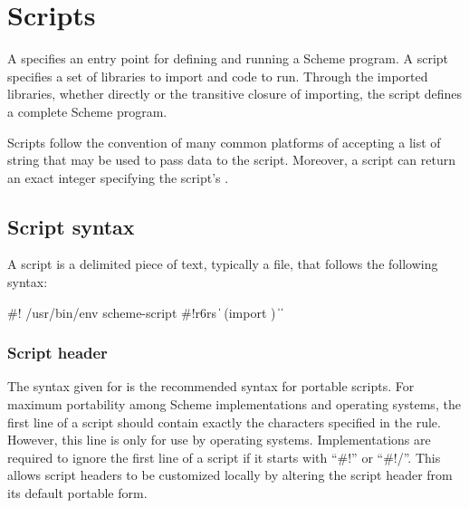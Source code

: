 \chapter{Scripts}
\label{scriptchapter}

A  specifies an entry point for defining and running
a Scheme program.  A script specifies a set of libraries to import and
code to run.  Through the imported libraries, whether directly or the
transitive closure of importing, the script defines a complete Scheme
program.

Scripts follow the convention of many common platforms of accepting a
list of string  that may be used to
pass data to the script.  Moreover, a script can return an exact
integer specifying the script's .

\section{Script syntax}

A script is a delimited piece of text, typically a file, that follows
the following syntax:

\begin{grammar}
 \: \#! /usr/bin/env scheme-script
  \> 
  \> 
 \: \#!r6rs  
  \> \|  
 \: (import )
 \:  
 \: 
\> \| 
\> \| 
\end{grammar}

\subsection{Script header}

The syntax given for  is the recommended syntax for 
portable scripts.  For maximum portability among Scheme implementations
and operating systems, the first line of a script should contain exactly 
the characters specified in the rule.  However, this line is only for use 
by operating systems.  Implementations are required to ignore the first 
line of a script if it starts with ``{\cf \#!}''
or ``{\cf \#!/}''.  This allows script
headers to be customized locally by altering the script header from its
default portable form.

